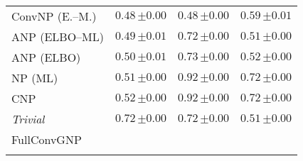 \begin{tabular}[t]{lccc}
ConvNP (E.--M.) & $0.48\,{ \scriptstyle \pm  0.00 }$ & $0.48\,{ \scriptstyle \pm  0.00 }$ & $0.59\,{ \scriptstyle \pm  0.01 }$ \\ 
ANP (ELBO--ML) & $0.49\,{ \scriptstyle \pm  0.01 }$ & $0.72\,{ \scriptstyle \pm  0.00 }$ & $0.51\,{ \scriptstyle \pm  0.00 }$ \\ 
ANP (ELBO) & $0.50\,{ \scriptstyle \pm  0.01 }$ & $0.73\,{ \scriptstyle \pm  0.00 }$ & $0.52\,{ \scriptstyle \pm  0.00 }$ \\ 
NP (ML) & $0.51\,{ \scriptstyle \pm  0.00 }$ & $0.92\,{ \scriptstyle \pm  0.00 }$ & $0.72\,{ \scriptstyle \pm  0.00 }$ \\ 
CNP & $0.52\,{ \scriptstyle \pm  0.00 }$ & $0.92\,{ \scriptstyle \pm  0.00 }$ & $0.72\,{ \scriptstyle \pm  0.00 }$ \\ 
{\normalshape \textit{Trivial}} & $0.72\,{ \scriptstyle \pm  0.00 }$ & $0.72\,{ \scriptstyle \pm  0.00 }$ & $0.51\,{ \scriptstyle \pm  0.00 }$ \\ 
FullConvGNP &  &  &  \\ 
\bottomrule \\ 
\end{tabular} 
